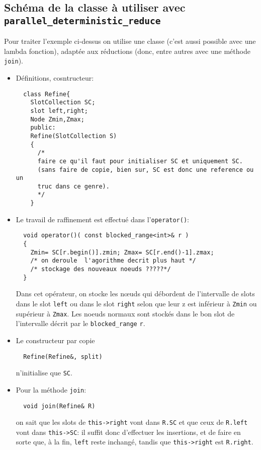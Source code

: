 \documentclass[10pt]{article}
\begin{document}
\subsection{Schéma de la classe à utiliser avec
  \texttt{parallel\_deterministic\_reduce}}Pour traiter l'exemple
ci-dessus on utilise une classe (c'est aussi possible avec une lambda
fonction), adaptée aux réductions (donc, entre autres avec une
méthode \texttt{join}).
\begin{itemize}
  \item Définitions, cosntructeur:
\begin{lstlisting}
  class Refine{
    SlotCollection SC;
    slot left,right;
    Node Zmin,Zmax;
    public:
    Refine(SlotCollection S)
    {
      /*  
      faire ce qu'il faut pour initialiser SC et uniquement SC.
      (sans faire de copie, bien sur, SC est donc une reference ou un
      truc dans ce genre).
      */
    }
\end{lstlisting}
\item Le travail de raffinement est effectué dans l'\texttt{operator()}:
\begin{lstlisting}
  void operator()( const blocked_range<int>& r )
  {
    Zmin= SC[r.begin()].zmin; Zmax= SC[r.end()-1].zmax;
    /* on deroule  l'agorithme decrit plus haut */
    /* stockage des nouveaux noeuds ?????*/
  }
\end{lstlisting}

Dans cet opérateur, on stocke les nœuds qui débordent de l'intervalle
de slots dans le slot \texttt{left} ou dans le slot \texttt{right} selon
que leur z est 
inférieur à \texttt{Zmin} ou supérieur à \texttt{Zmax}.
Les noeuds \og normaux\fg{} sont stockés dans le bon slot de
l'intervalle décrit par le \texttt{blocked\_range} \texttt{r}.

\item Le constructeur par copie
\begin{lstlisting}
  Refine(Refine&, split)
\end{lstlisting}
  n'initialise que
\texttt{SC}.

\item Pour la méthode \texttt{join}:
\begin{lstlisting}
  void join(Refine& R)
\end{lstlisting}
on sait que les slots de \texttt{this->right} vont dans \texttt{R.SC} et que ceux de
\texttt{R.left} vont dans \texttt{this->SC}: il suffit donc d'effectuer les
insertions, et de faire en sorte que, à  la fin, \texttt{left} reste  inchangé, tandis que
\texttt{this->right} est \texttt{R.right}.
\end{itemize}
\end{document}

